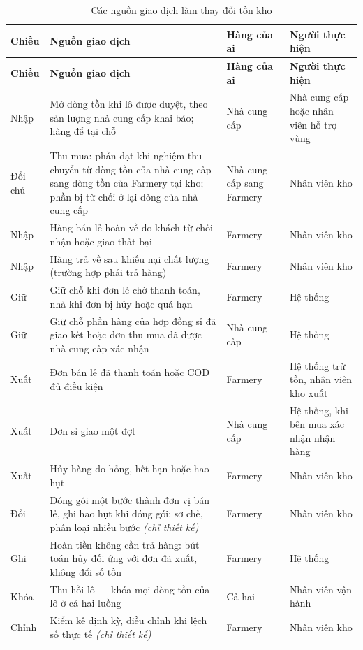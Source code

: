 \begingroup
\tblsetup\tblzebra
\begin{longtable}{L{1.18cm} L{5.76cm} L{3.64cm} L{3.96cm}}
\caption{Các nguồn giao dịch làm thay đổi tồn kho}
\label{tab:nguon-giaodich} \\
\toprule
{}
\textbf{Chiều} & \textbf{Nguồn giao dịch} & \textbf{Hàng của ai} & \textbf{Người thực hiện} \\
\midrule
\endfirsthead
\toprule
{}
\textbf{Chiều} & \textbf{Nguồn giao dịch} & \textbf{Hàng của ai} & \textbf{Người thực hiện} \\
\midrule
\endhead
\bottomrule
\endfoot
Nhập & Mở dòng tồn khi lô được duyệt, theo sản lượng nhà cung cấp khai báo; hàng để tại chỗ & Nhà cung cấp & Nhà cung cấp hoặc nhân viên hỗ trợ vùng \\
Đổi chủ & Thu mua: phần đạt khi nghiệm thu chuyển từ dòng tồn của nhà cung cấp sang dòng tồn của Farmery tại kho; phần bị từ chối ở lại dòng của nhà cung cấp & Nhà cung cấp sang Farmery & Nhân viên kho \\
Nhập & Hàng bán lẻ hoàn về do khách từ chối nhận hoặc giao thất bại & Farmery & Nhân viên kho \\
Nhập & Hàng trả về sau khiếu nại chất lượng (trường hợp phải trả hàng) & Farmery & Nhân viên kho \\
Giữ & Giữ chỗ khi đơn lẻ chờ thanh toán, nhả khi đơn bị hủy hoặc quá hạn & Farmery & Hệ thống \\
Giữ & Giữ chỗ phần hàng của hợp đồng sỉ đã giao kết hoặc đơn thu mua đã được nhà cung cấp xác nhận & Nhà cung cấp & Hệ thống \\
Xuất & Đơn bán lẻ đã thanh toán hoặc COD đủ điều kiện & Farmery & Hệ thống trừ tồn, nhân viên kho xuất \\
Xuất & Đơn sỉ giao một đợt & Nhà cung cấp & Hệ thống, khi bên mua xác nhận nhận hàng \\
Xuất & Hủy hàng do hỏng, hết hạn hoặc hao hụt & Farmery & Nhân viên kho \\
Đổi & Đóng gói một bước thành đơn vị bán lẻ, ghi hao hụt khi đóng gói; sơ chế, phân loại nhiều bước \emph{(chỉ thiết kế)} & Farmery & Nhân viên kho \\
Ghi & Hoàn tiền không cần trả hàng: bút toán hủy đối ứng với đơn đã xuất, không đổi số tồn & Farmery & Hệ thống \\
Khóa & Thu hồi lô --- khóa mọi dòng tồn của lô ở cả hai luồng & Cả hai & Nhân viên vận hành \\
Chỉnh & Kiểm kê định kỳ, điều chỉnh khi lệch số thực tế \emph{(chỉ thiết kế)} & Farmery & Nhân viên kho \\
\end{longtable}
\endgroup

